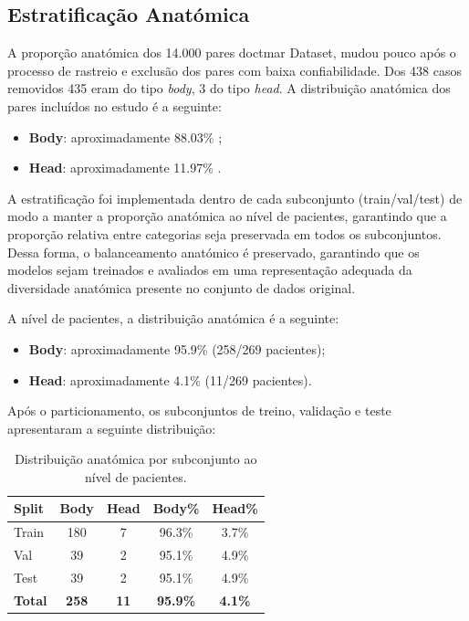 \subsection{Estratificação Anatómica} 
A proporção anatómica dos 14.000 pares do\acrshort{ctmar} Dataset, mudou pouco após o processo de rastreio e exclusão dos pares com baixa confiabilidade. Dos 438 casos removidos 435 eram do tipo \textit{body}, 3 do tipo \textit{head}. A distribuição anatómica dos pares incluídos no estudo é a seguinte:
\begin{itemize}
    \item \textbf{Body}: aproximadamente 88.03\% ;
    \item \textbf{Head}: aproximadamente 11.97\% .
\end{itemize}


A estratificação foi implementada dentro de cada subconjunto (train/val/test) de modo a manter a proporção anatómica ao nível de pacientes, garantindo que a proporção relativa entre categorias seja preservada em todos os subconjuntos.
Dessa forma, o balanceamento anatómico é preservado, garantindo que os modelos sejam treinados e avaliados em uma representação adequada da diversidade anatómica presente no conjunto de dados original. 

A nível de pacientes, a distribuição anatómica é a seguinte:
\begin{itemize}
    \item \textbf{Body}: aproximadamente 95.9\% (258/269 pacientes);
    \item \textbf{Head}: aproximadamente 4.1\% (11/269 pacientes).
\end{itemize}

Após o particionamento, os subconjuntos de treino, validação e teste apresentaram a seguinte distribuição:

\begin{table}[H]
    \centering
    \caption{Distribuição anatómica por subconjunto ao nível de pacientes.}
    \label{tab:split_anatomico}
    \begin{tabular}{lcccc}
        \hline
        \textbf{Split} & \textbf{Body} & \textbf{Head}  &\textbf{Body\%} & \textbf{Head\%} \\
        \hline
        Train & 180 & 7 & 96.3\% & 3.7\% \\
        Val   & 39  & 2  & 95.1\% & 4.9\% \\
        Test  & 39  & 2  & 95.1\% & 4.9\% \\
        \hline
        \textbf{Total} & \textbf{258} & \textbf{11} & \textbf{95.9\%} & \textbf{4.1\%} \\
        \hline
    \end{tabular}
\end{table}

